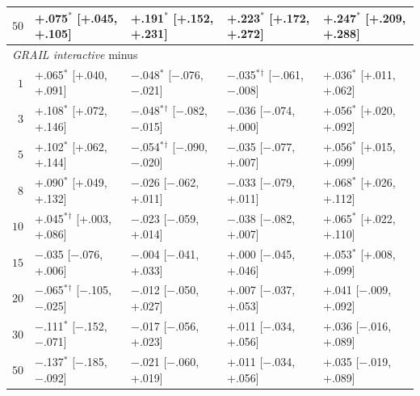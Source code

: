 \begin{table}[h]
\begin{threeparttable}
\begin{tabular}{rllll}
$50$ & +.075$^{*}$\phantom{$^{\dagger}$} [+.045, +.105] & +.191$^{*}$\phantom{$^{\dagger}$} [+.152, +.231] & +.223$^{*}$\phantom{$^{\dagger}$} [+.172, +.272] & +.247$^{*}$\phantom{$^{\dagger}$} [+.209, +.288] \\
\midrule
\multicolumn{5}{l}{\emph{GRAIL interactive} minus} \\
$1$ & +.065$^{*}$\phantom{$^{\dagger}$} [+.040, +.091] & $-$.048$^{*}$\phantom{$^{\dagger}$} [$-$.076, $-$.021] & $-$.035$^{*}$$^{\dagger}$ [$-$.061, $-$.008] & +.036$^{*}$\phantom{$^{\dagger}$} [+.011, +.062] \\
$3$ & +.108$^{*}$\phantom{$^{\dagger}$} [+.072, +.146] & $-$.048$^{*}$$^{\dagger}$ [$-$.082, $-$.015] & $-$.036\phantom{$^{*}$}\phantom{$^{\dagger}$} [$-$.074, +.000] & +.056$^{*}$\phantom{$^{\dagger}$} [+.020, +.092] \\
$5$ & +.102$^{*}$\phantom{$^{\dagger}$} [+.062, +.144] & $-$.054$^{*}$$^{\dagger}$ [$-$.090, $-$.020] & $-$.035\phantom{$^{*}$}\phantom{$^{\dagger}$} [$-$.077, +.007] & +.056$^{*}$\phantom{$^{\dagger}$} [+.015, +.099] \\
$8$ & +.090$^{*}$\phantom{$^{\dagger}$} [+.049, +.132] & $-$.026\phantom{$^{*}$}\phantom{$^{\dagger}$} [$-$.062, +.011] & $-$.033\phantom{$^{*}$}\phantom{$^{\dagger}$} [$-$.079, +.011] & +.068$^{*}$\phantom{$^{\dagger}$} [+.026, +.112] \\
$10$ & +.045$^{*}$$^{\dagger}$ [+.003, +.086] & $-$.023\phantom{$^{*}$}\phantom{$^{\dagger}$} [$-$.059, +.014] & $-$.038\phantom{$^{*}$}\phantom{$^{\dagger}$} [$-$.082, +.007] & +.065$^{*}$\phantom{$^{\dagger}$} [+.022, +.110] \\
$15$ & $-$.035\phantom{$^{*}$}\phantom{$^{\dagger}$} [$-$.076, +.006] & $-$.004\phantom{$^{*}$}\phantom{$^{\dagger}$} [$-$.041, +.033] & +.000\phantom{$^{*}$}\phantom{$^{\dagger}$} [$-$.045, +.046] & +.053$^{*}$\phantom{$^{\dagger}$} [+.008, +.099] \\
$20$ & $-$.065$^{*}$$^{\dagger}$ [$-$.105, $-$.025] & $-$.012\phantom{$^{*}$}\phantom{$^{\dagger}$} [$-$.050, +.027] & +.007\phantom{$^{*}$}\phantom{$^{\dagger}$} [$-$.037, +.053] & +.041\phantom{$^{*}$}\phantom{$^{\dagger}$} [$-$.009, +.092] \\
$30$ & $-$.111$^{*}$\phantom{$^{\dagger}$} [$-$.152, $-$.071] & $-$.017\phantom{$^{*}$}\phantom{$^{\dagger}$} [$-$.056, +.023] & +.011\phantom{$^{*}$}\phantom{$^{\dagger}$} [$-$.034, +.056] & +.036\phantom{$^{*}$}\phantom{$^{\dagger}$} [$-$.016, +.089] \\
$50$ & $-$.137$^{*}$\phantom{$^{\dagger}$} [$-$.185, $-$.092] & $-$.021\phantom{$^{*}$}\phantom{$^{\dagger}$} [$-$.060, +.019] & +.011\phantom{$^{*}$}\phantom{$^{\dagger}$} [$-$.034, +.056] & +.035\phantom{$^{*}$}\phantom{$^{\dagger}$} [$-$.019, +.089] \\
\bottomrule
\end{tabular}


\end{threeparttable}
\end{table}
